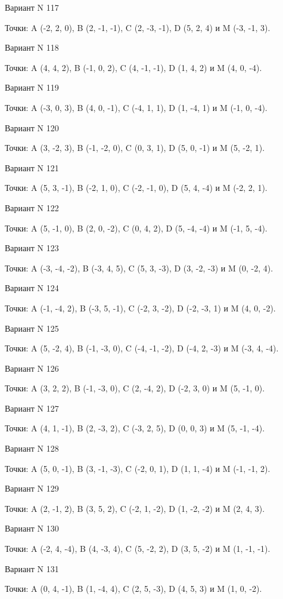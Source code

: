 \documentclass[11pt]{report}
\begin{document}
Вариант N 117

Точки: A (-2, 2, 0), B (2, -1, -1), C (2, -3, -1), D (5, 2, 4) и M (-3, -1, 3).

Вариант N 118

Точки: A (4, 4, 2), B (-1, 0, 2), C (4, -1, -1), D (1, 4, 2) и M (4, 0, -4).

Вариант N 119

Точки: A (-3, 0, 3), B (4, 0, -1), C (-4, 1, 1), D (1, -4, 1) и M (-1, 0, -4).

Вариант N 120

Точки: A (3, -2, 3), B (-1, -2, 0), C (0, 3, 1), D (5, 0, -1) и M (5, -2, 1).

Вариант N 121

Точки: A (5, 3, -1), B (-2, 1, 0), C (-2, -1, 0), D (5, 4, -4) и M (-2, 2, 1).

Вариант N 122

Точки: A (5, -1, 0), B (2, 0, -2), C (0, 4, 2), D (5, -4, -4) и M (-1, 5, -4).

Вариант N 123

Точки: A (-3, -4, -2), B (-3, 4, 5), C (5, 3, -3), D (3, -2, -3) и M (0, -2, 4).

Вариант N 124

Точки: A (-1, -4, 2), B (-3, 5, -1), C (-2, 3, -2), D (-2, -3, 1) и M (4, 0, -2).

Вариант N 125

Точки: A (5, -2, 4), B (-1, -3, 0), C (-4, -1, -2), D (-4, 2, -3) и M (-3, 4, -4).

Вариант N 126

Точки: A (3, 2, 2), B (-1, -3, 0), C (2, -4, 2), D (-2, 3, 0) и M (5, -1, 0).

Вариант N 127

Точки: A (4, 1, -1), B (2, -3, 2), C (-3, 2, 5), D (0, 0, 3) и M (5, -1, -4).

Вариант N 128

Точки: A (5, 0, -1), B (3, -1, -3), C (-2, 0, 1), D (1, 1, -4) и M (-1, -1, 2).

Вариант N 129

Точки: A (2, -1, 2), B (3, 5, 2), C (-2, 1, -2), D (1, -2, -2) и M (2, 4, 3).

Вариант N 130

Точки: A (-2, 4, -4), B (4, -3, 4), C (5, -2, 2), D (3, 5, -2) и M (1, -1, -1).

Вариант N 131

Точки: A (0, 4, -1), B (1, -4, 4), C (2, 5, -3), D (4, 5, 3) и M (1, 0, -2).
\end{document}
